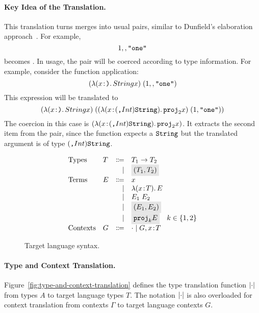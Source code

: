 \paragraph{Key Idea of the Translation.}
This translation turns merges into usual pairs, similar to Dunfield's
elaboration approach~\cite{dunfield2014elaborating}.
For example, \[ 1 ,, \texttt{"one"} \] becomes 
{}. In usage, the pair will be coerced according to type
information. For example, consider the function application: \[ (\lambda (x \!:\! \texttt{)}.\, String x) \; (1 ,, \texttt{"one"}) \] This expression will be translated to \[ (\lambda (x \!:\! \texttt{)}.\, String x) \; ((\lambda (x \!:\! (\texttt{,} Int) \texttt{String}).\, {\texttt{proj}}_{2} x) \; (1, \texttt{"one"})) \] The coercion in this case is $(\lambda (x \!:\! (\texttt{,} Int) \texttt{String}).\, {\texttt{proj}}_{2} x)$. It extracts the second item from the pair, since
the function expects a $\texttt{String}$ but the translated argument is of type $(\texttt{,} Int) \texttt{String}$.


\begin{figure}[h]
  \[
    \begin{array}{llrl}
      \text{Types}    & T & \Coloneqq & {T_1} \to {T_2} \\
                      &   & \mid      & \highlight {$ \pair {T_1} {T_2} $} \\
      \text{Terms}    & E & \Coloneqq & x \\
                      &   & \mid      & \lamty x T E \\
                      &   & \mid      & \app {E_1} {E_2} \\
                      &   & \mid      & \highlight {$ \pair {E_1} {E_2} $} \\
                      &   & \mid      & \highlight {$ \proj k E $} \quad k \in \{ 1, 2 \} \\
      \text{Contexts} & G & \Coloneqq & \cdot \mid G, x \oftype T \\
    \end{array}
  \]
  \caption{Target language syntax.}
  \label{fig:f-syntax}
\end{figure}

\paragraph{Type and Context Translation.}

Figure~\ref{fig:type-and-context-translation} defines the type translation
function $\lvert \cdot \rvert$ from \name types $A$ to target language types $T$. The
notation $\lvert \cdot \rvert$ is also overloaded for context translation from \name
contexts $\Gamma$ to target language contexts $G$.

